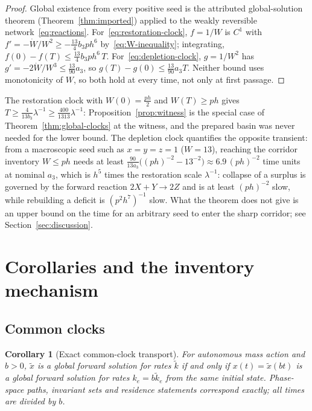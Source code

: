 \documentclass[11pt,a4paper]{article}
\theoremstyle{plain}
\newtheorem{corollary}[theorem]{Corollary}
\theoremstyle{definition}
\theoremstyle{remark}
\begin{document}
\begin{proof}
Global existence from every positive seed is the attributed global-solution theorem (Theorem~\ref{thm:imported}) applied to the weakly reversible network~\eqref{eq:reactions}. For~\eqref{eq:restoration-clock}, $f=1/W$ is $C^1$ with $f'=-\dot W/W^2\ge-\tfrac{13}{4}b_3ph^6$ by~\eqref{eq:W-inequality}; integrating, $f(0)-f(T)\le\tfrac{13}{4}b_3ph^6\,T$. For~\eqref{eq:depletion-clock}, $g=1/W^2$ has $g'=-2\dot W/W^3\le\tfrac{13}{90}a_3$, so $g(T)-g(0)\le\tfrac{13}{90}a_3T$. Neither bound uses monotonicity of $W$, so both hold at every time, not only at first passage.
\end{proof}

The restoration clock with $W(0)=\tfrac{ph}2$ and $W(T)\ge ph$ gives $T\ge\frac{4}{13b_3}\lambda^{-1}\ge\frac{400}{1313}\lambda^{-1}$: Proposition~\ref{prop:witness} is the special case of Theorem~\ref{thm:global-clocks} at the witness, and the prepared basin was never needed for the lower bound. The depletion clock quantifies the opposite transient: from a macroscopic seed such as $x=y=z=1$ ($W=13$), reaching the corridor inventory $W\le ph$ needs at least $\frac{90}{13a_3}\big((ph)^{-2}-13^{-2}\big)\approx6.9\,(ph)^{-2}$ time units at nominal $a_3$, which is $h^{5}$ times the restoration scale $\lambda^{-1}$: collapse of a surplus is governed by the forward reaction $2X+Y\to2Z$ and is at least $(ph)^{-2}$ slow, while rebuilding a deficit is $(p^2h^7)^{-1}$ slow. What the theorem does not give is an upper bound on the time for an arbitrary seed to enter the sharp corridor; see Section~\ref{sec:discussion}.

\section{Corollaries and the inventory mechanism}
\label{sec:corollaries}

\subsection{Common clocks}
\begin{corollary}[Exact common-clock transport]\label{cor:clock}
For autonomous mass action and $b>0$, $\tilde x$ is a global forward solution for rates $\tilde k$ if and only if $x(t)=\tilde x(bt)$ is a global forward solution for rates $k_e=b\tilde k_e$ from the same initial state. Phase-space paths, invariant sets and residence statements correspond exactly; all times are divided by $b$.
\end{corollary}
\end{document}
